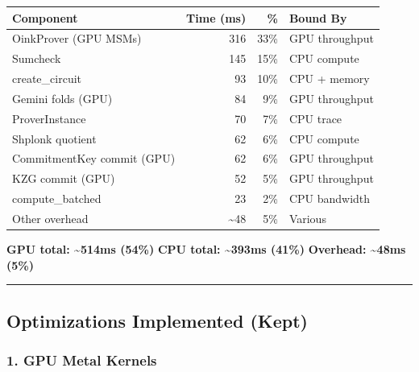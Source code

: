 \documentclass[
]{article}
\newcounter{none} %
\begin{document}
{\def\LTcaptype{none} %
\begin{longtable}[]{@{}lrrl@{}}
\toprule\noalign{}
Component & Time (ms) & \% & Bound By \\
\midrule\noalign{}
\endhead
\bottomrule\noalign{}
\endlastfoot
OinkProver (GPU MSMs) & 316 & 33\% & GPU throughput \\
Sumcheck & 145 & 15\% & CPU compute \\
create\_circuit & 93 & 10\% & CPU + memory \\
Gemini folds (GPU) & 84 & 9\% & GPU throughput \\
ProverInstance & 70 & 7\% & CPU trace \\
Shplonk quotient & 62 & 6\% & CPU compute \\
CommitmentKey commit (GPU) & 62 & 6\% & GPU throughput \\
KZG commit (GPU) & 52 & 5\% & GPU throughput \\
compute\_batched & 23 & 2\% & CPU bandwidth \\
Other overhead & \textasciitilde48 & 5\% & Various \\
\end{longtable}
}

\textbf{GPU total: \textasciitilde514ms (54\%)} \textbar{} \textbf{CPU
total: \textasciitilde393ms (41\%)} \textbar{} \textbf{Overhead:
\textasciitilde48ms (5\%)}

\begin{center}\rule{0.5\linewidth}{0.5pt}\end{center}

\subsection{Optimizations Implemented
(Kept)}\label{optimizations-implemented-kept}

\subsubsection{1. GPU Metal Kernels}\label{gpu-metal-kernels}
\end{document}
